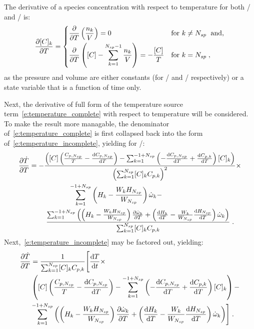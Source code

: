 \documentclass[12pt,number,sort&compress]{elsarticle}
\begin{document}
The derivative of a species concentration with respect to temperature for both \conp/ and \conv/ is:
\begin{align}
 \frac{\partial [C]_{k}}{\partial T} =
 \begin{dcases}
  \frac{\partial}{\partial T} \left(\frac{n_k}{V}\right) = 0 & \text{for } k \ne \ns/\;\text{ and,} \\
  \frac{\partial}{\partial T} \left([C] - \sum_{k=1}^{\ns/ - 1}{\frac{n_k}{V}}\right) = -\frac{[C]}{T} & \text{for } k = \ns/\;,
 \end{dcases}
\end{align}
as the pressure and volume are either constants (for \conp/ and \conv/ respectively) or a state variable that is a function of time only.

Next, the derivative of full form of the temperature source term~\cref{e:temperature_complete} with respect to temperature will be considered.
To make the result more managable, the denominator of~\cref{e:temperature_complete} is first collapsed back into the form of~\cref{e:temperature_incomplete}, yielding for \conp/:
\begin{align}
 \frac{\partial\dot{T}}{\partial{T}} &= - \frac{\left( [C] \left( \frac{{C_{p, \ns/}}}{T} - \frac{\text{d} {C_{p, \ns/}} }{\text{d} T } \right) - \sum_{k=1}^{-1 + \ns/} \left(- \frac{\text{d} {C_{p, \ns/}} }{\text{d} T } + \frac{\text{d} C_{p, k} }{\text{d} T }\right) [C]_{k}\right)}{\left(\sum_{k=1}^{\ns/} [C]_{k} {C_{p, k}}\right)^{2}} \times \nonumber \\
				     & \mathindent[largerindent] \sum_{k=1}^{-1 + \ns/} \left(H_{k} - \frac{W_{k} H_{\ns/}}{W_{\ns/}}\right) \dot{\omega}_{k} - \nonumber \\
				     & \mathindent \frac{\sum_{k=1}^{-1 + \ns/} \left(\left(H_{k} - \frac{W_{k} H_{\ns/}}{W_{\ns/}}\right) \frac{\partial \dot{\omega}_{k} }{\partial T } + \left(\frac{\text{d} H_{k} }{\text{d} T } - \frac{W_{k}}{W_{\ns/}} \frac{\text{d} H_{\ns/} }{\text{d} T }\right) \dot{\omega}_{k}\right)}{\sum_{k=1}^{\ns/} [C]_{k} {C_{p, k}}} \;.
\end{align}
Next,~\cref{e:temperature_incomplete} may be factored out, yielding:
\begin{align}
 \frac{\partial\dot{T}}{\partial{T}} &= \frac{1}{\sum_{k=1}^{\ns/} [C]_{k} {C_{p, k}}} \Biggl[ \frac{\text{d} T }{\text{d} t } \times \nonumber \\
				     & \left( [C] \left( \frac{{C_{p, \ns/}}}{T} - \frac{\text{d} {C_{p, \ns/}} }{\text{d} T } \right) - \sum_{k=1}^{-1 + \ns/} \left(- \frac{\text{d} {C_{p, \ns/}} }{\text{d} T } + \frac{\text{d} {C_{p, k}} }{\text{d} T }\right) [C]_{k}\right) - \nonumber \\
				     & \sum_{k=1}^{-1 + \ns/} \left(\left(H_{k} - \frac{W_{k} H_{\ns/}}{W_{\ns/}}\right) \frac{\partial \dot{\omega}_{k} }{\partial T } + \left(\frac{\text{d} H_{k} }{\text{d} T } - \frac{W_{k}}{W_{\ns/}} \frac{\text{d} H_{\ns/} }{\text{d} T }\right) \dot{\omega}_{k}\right) \Biggr]\;.
\end{align}
\end{document}
